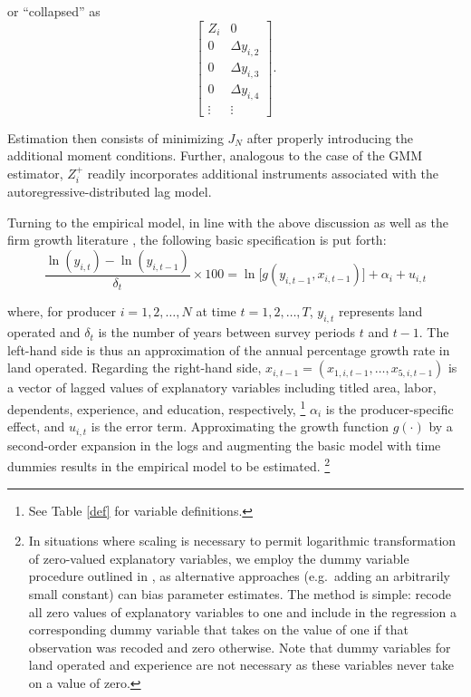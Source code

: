 \documentclass[english]{article}
\begin{document}
\noindent
or ``collapsed'' as
\begin{equation}
\left[ 
\begin{array}{ccccccc}
Z_i  & 0  \\
0 & \Delta y_{i,2}  \\
0 & \Delta y_{i,3}  \\
0 & \Delta y_{i,4}  \\
\vdots & \vdots 
\end{array}
\right].
\label{zcnew}
\end{equation}

\noindent
Estimation then consists of minimizing $J_N$ after properly introducing the 
additional moment conditions. 
Further, analogous to the case of the \citeauthor{arellano1991} GMM 
estimator, $Z_{i}^{+}$ readily incorporates additional instruments 
associated with the autoregressive-distributed lag model.

Turning to the empirical model, in line with the above discussion as well as 
the firm growth literature
\citep{evans1987, sleuwaegen2002, rizov2003, dries2004b}, the following 
basic specification is put forth:
\begin{equation}
\frac{\ln (y_{i,t}) - \ln(y_{i,t-1})}{\delta_t} \times 100 = \ln 
\big[g(y_{i,t-1}, x_{i,t-1})\big] + \alpha_i + u_{i,t}
\label{emodel}
\end{equation}

\noindent
where, for producer $i=1,2,\ldots,N$ at time $t=1,2,\ldots,T$, $y_{i,t}$
represents land operated and $\delta_t$ is the number of years between 
survey periods $t$ and $t-1$. 
The left-hand side is thus an approximation of the annual percentage growth 
rate in land operated. 
Regarding the right-hand side, $x_{i,t-1} = (x_{1,i,t-1}, \ldots, x_{5,i,t-1} )$ 
is a vector of lagged values of explanatory variables including titled area, 
labor, dependents, experience, and education, respectively,%
\footnote{See Table \ref{def} for variable definitions.} 
$\alpha_i$ is the producer-specific effect, and $u_{i,t}$ is the error term. 
Approximating the growth function $g(\cdot)$ by a second-order expansion 
in the logs and augmenting the basic model with time dummies results in the 
empirical model to be estimated.%
\footnote{\label{note: zvdum}In situations where scaling is necessary to 
permit logarithmic transformation of zero-valued explanatory variables, 
we employ the dummy variable procedure outlined in \citet{battese1997}, 
as alternative approaches (e.g.\ adding an arbitrarily small constant) can bias 
parameter estimates.
The method is simple: recode all zero values of explanatory variables to one 
and include in the regression a corresponding dummy variable that takes on 
the value of one if that observation was recoded and zero otherwise. 
Note that dummy variables for land operated and experience are not 
necessary as these variables never take on a value of zero.}
\end{document}
